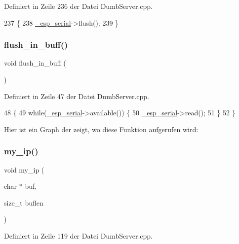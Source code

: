 Definiert in Zeile 236 der Datei Dumb\+Server.\+cpp.


\begin{DoxyCode}
237 \{
238   \hyperlink{classEspServer_a552aab874ad99b696f4c997d6f5a4746}{\_esp\_serial}->flush();
239 \}
\end{DoxyCode}
\mbox{\label{classEspServer_a1d791edc8eca304acc71f702f07c0437}} 
\subsubsection{\texorpdfstring{flush\+\_\+in\+\_\+buff()}{flush\_in\_buff()}}
{\footnotesize\ttfamily void flush\+\_\+in\+\_\+buff (\begin{DoxyParamCaption}{ }\end{DoxyParamCaption})\hspace{0.3cm}{\ttfamily [private]}}



Definiert in Zeile 47 der Datei Dumb\+Server.\+cpp.


\begin{DoxyCode}
48 \{
49   \textcolor{keywordflow}{while}(\hyperlink{classEspServer_a552aab874ad99b696f4c997d6f5a4746}{\_esp\_serial}->available()) \{
50     \hyperlink{classEspServer_a552aab874ad99b696f4c997d6f5a4746}{\_esp\_serial}->read();
51   \}
52 \}
\end{DoxyCode}
Hier ist ein Graph der zeigt, wo diese Funktion aufgerufen wird\+:
\mbox{\label{classEspServer_a01953c4cc039c37f94dc3e1057126abb}} 
\subsubsection{\texorpdfstring{my\+\_\+ip()}{my\_ip()}}
{\footnotesize\ttfamily void my\+\_\+ip (\begin{DoxyParamCaption}\item[{char $\ast$}]{buf,  }\item[{size\+\_\+t}]{buflen }\end{DoxyParamCaption})}



Definiert in Zeile 119 der Datei Dumb\+Server.\+cpp.


